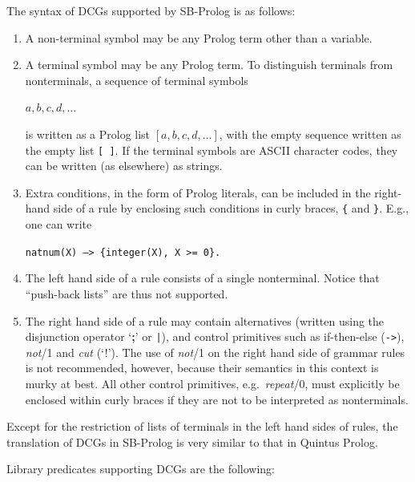 The syntax of DCGs supported by SB-Prolog is as follows:
\begin{enumerate}
\item A non-terminal symbol may be any Prolog term other than a variable.
\item A terminal symbol may be any Prolog term.
    To distinguish terminals from nonterminals, a sequence of terminal symbols
    \begin{center}
    {\tt $a, b, c, d, \ldots$}
    \end{center}
    is written as a Prolog list $[ a, b, c, d, \ldots ]$,
    with the empty sequence written as the empty list {\tt [\,]}.
    If the terminal symbols are ASCII character codes,
    they can be written (as elsewhere) as strings.
\item Extra conditions, in the form of Prolog literals, can be included in
    the right-hand side of a rule by enclosing such conditions in curly braces,
    {\tt \{} and {\tt \}}.
    E.g., one can write
    \begin{center}
    {\tt natnum(X) --> \{integer(X), X >= 0\}.}
    \end{center}
\item The left hand side of a rule consists of a single nonterminal.
    Notice that ``push-back lists'' are thus not supported.
\item The right hand side of a rule may contain alternatives (written using the
    disjunction operator `{\bf ;}' or \verb`|`), and control primitives such as
    if-then-else ({\tt ->}),
    {\em not}/1 and {\em cut} (`!').
    The use of {\em not}/1 on the right hand side of grammar rules is not
    recommended, however,
    because their semantics in this context is murky at best.
    All other control primitives, e.g.\ {\em repeat}/0, must explicitly
    be enclosed within curly braces if they are not to be interpreted as
    nonterminals.
\end{enumerate}

Except for the restriction of lists of terminals in the left hand sides of
rules, the translation of DCGs in SB-Prolog is very similar to that in
Quintus Prolog.

Library predicates supporting DCGs are the following:

